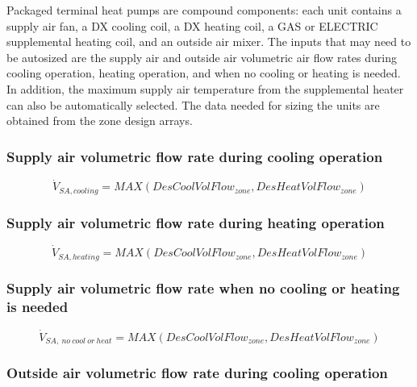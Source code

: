 Packaged terminal heat pumps are compound components: each unit contains a supply air fan, a DX cooling coil, a DX heating coil, a GAS or ELECTRIC supplemental heating coil, and an outside air mixer. The inputs that may need to be autosized are the supply air and outside air volumetric air flow rates during cooling operation, heating operation, and when no cooling or heating is needed. In addition, the maximum supply air temperature from the supplemental heater can also be automatically selected. The data needed for sizing the units are obtained from the zone design arrays.

\subsubsection{Supply air volumetric flow rate during cooling operation}\label{supply-air-volumetric-flow-rate-during-cooling-operation}

\begin{equation}
\dot V_{SA,cooling} = MAX(DesCoolVolFlow_{zone},DesHeatVolFlow_{zone})
\end{equation}

\subsubsection{Supply air volumetric flow rate during heating operation}\label{supply-air-volumetric-flow-rate-during-heating-operation}

\begin{equation}
\dot V_{SA,heating}  = MAX(DesCoolVolFlow_{zone},DesHeatVolFlow_{zone})
\end{equation}

\subsubsection{Supply air volumetric flow rate when no cooling or heating is needed}\label{supply-air-volumetric-flow-rate-when-no-cooling-or-heating-is-needed}

\begin{equation}
\dot V_{SA,~no~cool~or~heat}  = MAX(DesCoolVolFlow_{zone},DesHeatVolFlow_{zone})
\end{equation}

\subsubsection{Outside air volumetric flow rate during cooling operation}\label{outside-air-volumetric-flow-rate-during-cooling-operation}

